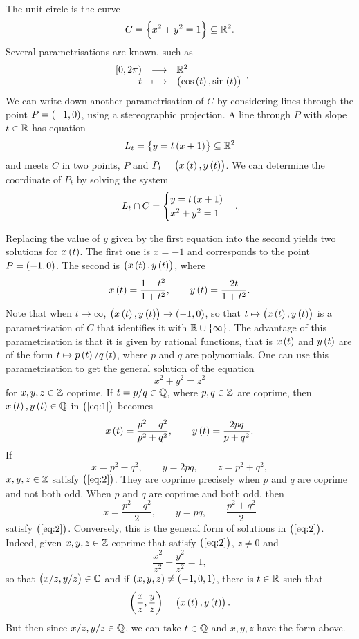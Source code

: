 \begin{example}
The unit circle is the curve
$$ C = \cbr{x^2 + y^2 = 1} \subseteq \R^2. $$
Several parametrisations are known, such as
$$ \function{\intco{0, 2\pi}}{\R^2}{t}{\br{\cos\br{t}, \sin\br{t}}}. $$
We can write down another parametrisation of $ C $ by considering lines through the point $ P = \br{-1, 0} $, using a stereographic projection. A line through $ P $ with slope $ t \in \mathbb{R} $ has equation
$$ L_t = \cbr{y = t\br{x + 1}} \subseteq \R^2 $$
and meets $ C $ in two points, $ P $ and $ P_t = \br{x\br{t}, y\br{t}} $. We can determine the coordinate of $ P_t $ by solving the system
$$ L_t \cap C =
\begin{cases}
y = t\br{x + 1} \\
x^2 + y^2 = 1
\end{cases}.
$$

\pagebreak

Replacing the value of $ y $ given by the first equation into the second yields two solutions for $ x\br{t} $. The first one is $ x = -1 $ and corresponds to the point $ P = \br{-1, 0} $. The second is $ \br{x\br{t}, y\br{t}} $, where
\begin{equation}
\label{eq:1}
x\br{t} = \dfrac{1 - t^2}{1 + t^2}, \qquad y\br{t} = \dfrac{2t}{1 + t^2}.
\end{equation}
Note that when $ t \to \infty $, $ \br{x\br{t}, y\br{t}} \to \br{-1, 0} $, so that $ t \mapsto \br{x\br{t}, y\br{t}} $ is a parametrisation of $ C $ that identifies it with $ \R \cup \cbr{\infty} $. The advantage of this parametrisation is that it is given by rational functions, that is $ x\br{t} $ and $ y\br{t} $ are of the form $ t \mapsto p\br{t} / q\br{t} $, where $ p $ and $ q $ are polynomials. One can use this parametrisation to get the general solution of the equation
\begin{equation}
\label{eq:2}
x^2 + y^2 = z^2
\end{equation}
for $ x, y, z \in \mathbb{Z} $ coprime. If $ t = p / q \in \mathbb{Q} $, where $ p, q \in \mathbb{Z} $ are coprime, then $ x\br{t}, y\br{t} \in \Q $ in $ \br{\ref{eq:1}} $ becomes
$$ x\br{t} = \dfrac{p^2 - q^2}{p^2 + q^2}, \qquad y\br{t} = \dfrac{2pq}{p + q^2}. $$
If
$$ x = p^2 - q^2, \qquad y = 2pq, \qquad z = p^2 + q^2, $$
$ x, y, z \in \mathbb{Z} $ satisfy $ \br{\ref{eq:2}} $. They are coprime precisely when $ p $ and $ q $ are coprime and not both odd. When $ p $ and $ q $ are coprime and both odd, then
$$ x = \dfrac{p^2 - q^2}{2}, \qquad y = pq, \qquad \dfrac{p^2 + q^2}{2} $$
satisfy $ \br{\ref{eq:2}} $. Conversely, this is the general form of solutions in $ \br{\ref{eq:2}} $. Indeed, given $ x, y, z \in \mathbb{Z} $ coprime that satisfy $ \br{\ref{eq:2}} $, $ z \ne 0 $ and
$$ \dfrac{x^2}{z^2} + \dfrac{y^2}{z^2} = 1, $$
so that $ \br{x / z, y / z} \in \C $ and if $ \br{x, y, z} \ne \br{-1, 0, 1} $, there is $ t \in \mathbb{R} $ such that
$$ \br{\dfrac{x}{z}, \dfrac{y}{z}} = \br{x\br{t}, y\br{t}}. $$
But then since $ x / z, y / z \in \mathbb{Q} $, we can take $ t \in \mathbb{Q} $ and $ x, y, z $ have the form above.
\end{example}

